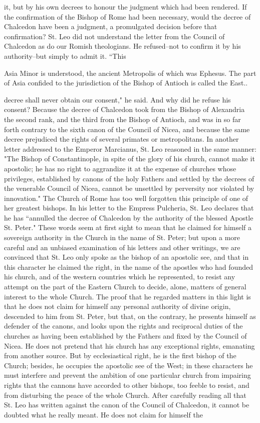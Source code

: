 it, but by his own decrees to honour the judgment which had been rendered. If the confirmation of the Bishop of Rome had been necessary, would the decree of Chalcedon have been a judgment, a promulgated decision before that confirmation? St. Leo did not understand the letter from the Council of Chalcedon as do our Romish theologians. He refused--not to confirm it by his authority--but simply to admit it. “This

Asia Minor is understood, the ancient Metropolis of which was Ephesus. The part of Asia confided to the jurisdiction of the Bishop of Antioch is called the East..

decree shall never obtain our consent," he said. And why did he refuse his consent? Because the decree of Chalcedon took from the Bishop of Alexandria the second rank, and the third from the Bishop of Antioch, and was in so far forth contrary to the sixth canon of the Council of Nicea, and because the same decree prejudiced the rights of several primates or metropolitans. In another letter addressed to the Emperor Marcianus, St. Leo reasoned in the same manner: "The Bishop of Constantinople, in spite of the glory of his church, cannot make it apostolic; he has no right to aggrandize it at the expense of churches whose privileges, established by canons of the holy Fathers and settled by the decrees of the venerable Council of Nicea, cannot be unsettled by perversity nor violated by innovation." The Church of Rome has too well forgotten this principle of one of her greatest bishops. In his letter to the Empress Pulcheria, St. Leo declares that he has “annulled the decree of Chalcedon by the authority of the blessed Apostle St. Peter." These words seem at first sight to mean that he claimed for himself a sovereign authority in the Church in the name of St. Peter; but upon a more careful and an unbiased examination of his letters and other writings, we are convinced that St. Leo only spoke as the bishop of an apostolic see, and that in this character he claimed the right, in the name of the apostles who had founded his church, and of the western countries which he represented, to resist any attempt on the part of the Eastern Church to decide, alone, matters of general interest to the whole Church. The proof that he regarded matters in this light is that he does not claim for himself any personal authority of divine origin, descended to him from St. Peter, but that, on the contrary, he presents himself as defender of the canons, and looks upon the rights and reciprocal duties of the churches as having been established by the Fathers and fixed by the Council of Nicea. He does not pretend that his church has any exceptional rights, emanating from another source. But by ecclesiastical right, he is the first bishop of the Church; besides, he occupies the apostolic see of the West; in these characters he must interfere and prevent the ambition of one particular church from impairing rights that the cannons have accorded to other bishops, too feeble to resist, and from disturbing the peace of the whole Church. After carefully reading all that St. Leo has written against the canon of the Council of Chalcedon, it cannot be doubted what he really meant. He does not claim for himself the 
